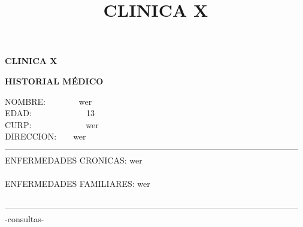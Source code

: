 \documentclass[10pt,a4paper]{letter}
\title{\bf CLINICA X}
\begin{document}
\begin{center}
{\scshape\LARGE \bf CLINICA X\par}
{\bf HISTORIAL MÉDICO\\}
\end{center}
NOMBRE:\ \ \ \ \ \ \ \ wer\\
EDAD:\ \ \ \ \ \ \ \ \ \ \ \ \ 13\\
CURP:\ \ \ \ \ \ \ \ \ \ \ \ \ wer \\
DIRECCION:\ \ \ \ wer\\
--------------------------------------------------------------------------------------------------------- \\
ENFERMEDADES CRONICAS: wer\\ \\
ENFERMEDADES FAMILIARES: wer \\ \\
--------------------------------------------------------------------------------------------------------- \\-consultas-
\end{document}
